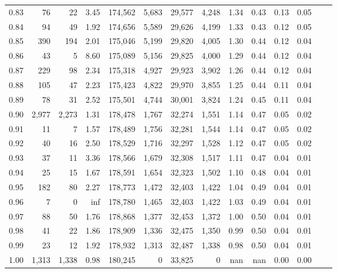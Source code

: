 \begin{tabular}{rrrrrrrrrrrrrr}
0.83 &      76 &     22 &    3.45 &  174,562 &    5,683 &  29,577 &   4,248 &  1.34 &  0.43 &  0.13 &      0.05 \\
0.84 &      94 &     49 &    1.92 &  174,656 &    5,589 &  29,626 &   4,199 &  1.33 &  0.43 &  0.12 &      0.05 \\
0.85 &     390 &    194 &    2.01 &  175,046 &    5,199 &  29,820 &   4,005 &  1.30 &  0.44 &  0.12 &      0.04 \\
0.86 &      43 &      5 &    8.60 &  175,089 &    5,156 &  29,825 &   4,000 &  1.29 &  0.44 &  0.12 &      0.04 \\
0.87 &     229 &     98 &    2.34 &  175,318 &    4,927 &  29,923 &   3,902 &  1.26 &  0.44 &  0.12 &      0.04 \\
0.88 &     105 &     47 &    2.23 &  175,423 &    4,822 &  29,970 &   3,855 &  1.25 &  0.44 &  0.11 &      0.04 \\
0.89 &      78 &     31 &    2.52 &  175,501 &    4,744 &  30,001 &   3,824 &  1.24 &  0.45 &  0.11 &      0.04 \\
0.90 &   2,977 &  2,273 &    1.31 &  178,478 &    1,767 &  32,274 &   1,551 &  1.14 &  0.47 &  0.05 &      0.02 \\
0.91 &      11 &      7 &    1.57 &  178,489 &    1,756 &  32,281 &   1,544 &  1.14 &  0.47 &  0.05 &      0.02 \\
0.92 &      40 &     16 &    2.50 &  178,529 &    1,716 &  32,297 &   1,528 &  1.12 &  0.47 &  0.05 &      0.02 \\
0.93 &      37 &     11 &    3.36 &  178,566 &    1,679 &  32,308 &   1,517 &  1.11 &  0.47 &  0.04 &      0.01 \\
0.94 &      25 &     15 &    1.67 &  178,591 &    1,654 &  32,323 &   1,502 &  1.10 &  0.48 &  0.04 &      0.01 \\
0.95 &     182 &     80 &    2.27 &  178,773 &    1,472 &  32,403 &   1,422 &  1.04 &  0.49 &  0.04 &      0.01 \\
0.96 &       7 &      0 &     inf &  178,780 &    1,465 &  32,403 &   1,422 &  1.03 &  0.49 &  0.04 &      0.01 \\
0.97 &      88 &     50 &    1.76 &  178,868 &    1,377 &  32,453 &   1,372 &  1.00 &  0.50 &  0.04 &      0.01 \\
0.98 &      41 &     22 &    1.86 &  178,909 &    1,336 &  32,475 &   1,350 &  0.99 &  0.50 &  0.04 &      0.01 \\
0.99 &      23 &     12 &    1.92 &  178,932 &    1,313 &  32,487 &   1,338 &  0.98 &  0.50 &  0.04 &      0.01 \\
1.00 &   1,313 &  1,338 &    0.98 &  180,245 &        0 &  33,825 &       0 &   nan &   nan &  0.00 &      0.00 \\
\bottomrule
\end{tabular}
